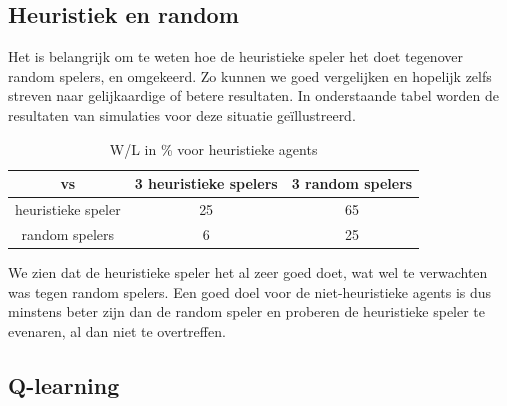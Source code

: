 \documentclass[11pt]{article}
\begin{document}
\subsection{Heuristiek en random}
Het is belangrijk om te weten hoe de heuristieke speler het doet tegenover random spelers, en omgekeerd. Zo kunnen we goed vergelijken en hopelijk zelfs streven naar gelijkaardige of betere resultaten. In onderstaande tabel worden de resultaten van simulaties voor deze situatie geïllustreerd.
\begin{table}[H]
        \centering
        \begin{tabular}{|c|c|c|}
                \hline
                  vs                & 3 heuristieke spelers & 3 random spelers \\
                \hline
                 heuristieke speler & 25         & 65\\
                 random spelers     & 6         & 25\\
                \hline
        \end{tabular}
        \caption{W/L in \% voor heuristieke agents}
\end{table}

We zien dat de heuristieke speler het al zeer goed doet, wat wel te verwachten was tegen random spelers. Een goed doel voor de niet-heuristieke agents is dus minstens beter zijn dan de random speler en proberen de heuristieke speler te evenaren, al dan niet te overtreffen.\\

\subsection{Q-learning}
\end{document}
